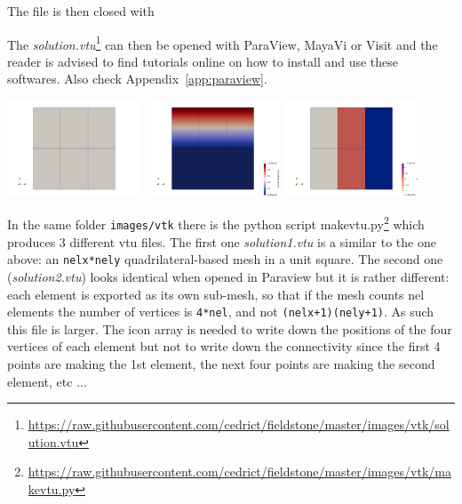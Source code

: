 

The file is then closed with



The {\sl solution.vtu}\footnote{\url{https://raw.githubusercontent.com/cedrict/fieldstone/master/images/vtk/solution.vtu}}  
can then be opened with ParaView, MayaVi or Visit and the reader 
is advised to find tutorials online on how to install and use these softwares. Also check Appendix~\ref{app:paraview}.

\begin{center}
\includegraphics[width=4cm]{images/vtk/grid}
\includegraphics[width=4cm]{images/vtk/vel}
\includegraphics[width=4cm]{images/vtk/press}
\end{center}

In the same folder {\tt images/vtk} there is the python script 
{\pythonfile makevtu.py}\footnote{\url{https://raw.githubusercontent.com/cedrict/fieldstone/master/images/vtk/makevtu.py}} which produces 3 different vtu files. The first one {\sl solution1.vtu} is a similar to the one above: an \lstinline{nelx*nely} quadrilateral-based mesh in a unit square. 
The second one ({\sl solution2.vtu}) looks identical when opened in Paraview but it is rather different: each element is exported as its own sub-mesh, so that if the mesh counts nel elements the number of vertices is \lstinline{4*nel}, and not \lstinline{(nelx+1)(nely+1)}. As such this file is larger. The icon array is needed to write down the positions of the four vertices of each element but not to write down the connectivity since the first 4 points are making the 1st element, the next four points are making the second element, etc ...

